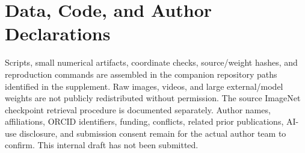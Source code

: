 \documentclass[journal]{IEEEtran}
\begin{document}
\section*{Data, Code, and Author Declarations}
Scripts, small numerical artifacts, coordinate checks, source/weight hashes, and reproduction commands are assembled in the companion repository paths identified in the supplement. Raw images, videos, and large external/model weights are not publicly redistributed without permission. The source ImageNet checkpoint retrieval procedure is documented separately. Author names, affiliations, ORCID identifiers, funding, conflicts, related prior publications, AI-use disclosure, and submission consent remain for the actual author team to confirm. This internal draft has not been submitted.


\end{document}
